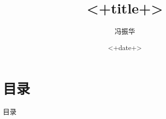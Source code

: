 \documentclass[a4paper,fontset = windows,aspectratio=169,9pt ]{ctexbeamer}
\title{<+title+>}
\author{ 冯振华\inst{1} }
\institute[BNU]%
{
    \inst{1} 淄博实验中学，物理组
}
\date{<+date+>}
\begin{document}
\frame{\titlepage}

\section{目录}
\begin{frame}{目录}
    \begin{columns}[t]
        \begin{column}{.48\textwidth}
            \tableofcontents[sections={1-4}] %
        \end{column}
        \begin{column}{.48\textwidth}
            \tableofcontents[sections={5-8}] %
        \end{column}
    \end{columns}
\end{frame}
\end{document}
